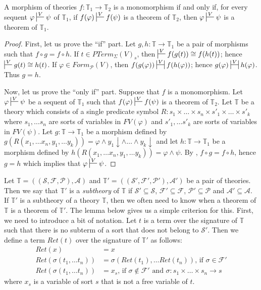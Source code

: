 \documentclass[reqno]{amsart}
\theoremstyle{definition}
\theoremstyle{remark}
\numberwithin{figure}{section}
\begin{document}
\begin{prop}[mono]
A morphism of theories $f : \mathbb{T}_1 \to \mathbb{T}_2$ is a monomorphism if and only if, for every sequent $\varphi \sststile{}{V} \psi$ of $\mathbb{T}_1$,
if $f(\varphi) \sststile{}{V} f(\psi)$ is a theorem of $\mathbb{T}_2$, then $\varphi \sststile{}{V} \psi$ is a theorem of $\mathbb{T}_1$.
\end{prop}
\begin{proof}
First, let us prove the ``if'' part.
Let $g,h : \mathbb{T} \to \mathbb{T}_1$ be a pair of morphisms such that $f \circ g = f \circ h$.
If $t \in PTerm_\Sigma(V)_s$, then $\sststile{}{V} f(g(t)) \cong f(h(t))$; hence $\sststile{}{V} g(t) \cong h(t)$.
If $\varphi \in Form_\mathcal{P}(V)$, then $f(g(\varphi)) \ssststile{}{V} f(h(\varphi))$; hence $g(\varphi) \ssststile{}{V} h(\varphi)$.
Thus $g = h$.

Now, let us prove the ``only if'' part.
Suppose that $f$ is a monomorphism.
Let $\varphi \sststile{}{V} \psi$ be a sequent of $\mathbb{T}_1$ such that $f(\varphi) \sststile{}{V} f(\psi)$ is a theorem of $\mathbb{T}_2$.
Let $\mathbb{T}$ be a theory which consists of a single predicate symbol $R : s_1 \times \ldots \times s_n \times s'_1 \times \ldots \times s'_k$
where $s_1, \ldots s_n$ are sorts of variables in $FV(\varphi)$ and $s'_1, \ldots s'_k$ are sorts of variables in $FV(\psi)$.
Let $g : \mathbb{T} \to \mathbb{T}_1$ be a morphism defined by $g(R(x_1, \ldots x_n, y_1, \ldots y_k)) = \varphi \land y_1\!\downarrow \land \ldots \land y_k\!\downarrow$ and
let $h : \mathbb{T} \to \mathbb{T}_1$ be a morphism defined by $h(R(x_1, \ldots x_n, y_1, \ldots y_k)) = \varphi \land \psi$.
By , $f \circ g = f \circ h$, hence $g = h$ which implies that $\varphi \sststile{}{V} \psi$.
\end{proof}

Let $\mathbb{T} = ((\mathcal{S},\mathcal{F},\mathcal{P}),\mathcal{A})$ and $\mathbb{T}' = ((\mathcal{S}',\mathcal{F}',\mathcal{P}'),\mathcal{A}')$ be a pair of theories.
Then we say that $\mathbb{T}'$ is a \emph{subtheory} of $\mathbb{T}$ if $\mathcal{S}' \subseteq \mathcal{S}$, $\mathcal{F}' \subseteq \mathcal{F}$, $\mathcal{P}' \subseteq \mathcal{P}$ and $\mathcal{A}' \subseteq \mathcal{A}$.
If $\mathbb{T}'$ is a subtheory of a theory $\mathbb{T}$, then we often need to know when a theorem of $\mathbb{T}$ is a theorem of $\mathbb{T}'$.
The lemma below gives us a simple criterion for this.
First, we need to introduce a bit of notation.
Let $t$ is a term over the signature of $\mathbb{T}$ such that there is no subterm of a sort that does not belong to $\mathcal{S}'$.
Then we define a term $Ret(t)$ over the signature of $\mathbb{T}'$ as follows:
\begin{align*}
Ret(x) & = x \\
Ret(\sigma(t_1, \ldots t_n)) & = \sigma(Ret(t_1), \ldots Ret(t_n)) \text{, if $\sigma \in \mathcal{F}'$} \\
Ret(\sigma(t_1, \ldots t_n)) & = x_s \text{, if $\sigma \notin \mathcal{F}'$ and $\sigma : s_1 \times \ldots \times s_n \to s$}
\end{align*}
where $x_s$ is a variable of sort $s$ that is not a free variable of $t$.
\end{document}

